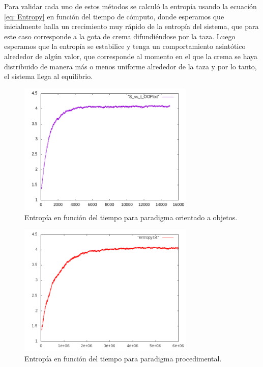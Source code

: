 \documentclass[12pt,twocolumn]{article}
\begin{document}
Para validar cada uno de estos métodos se calculó la entropía usando la ecuación \ref{eq: Entropy} en función del tiempo de cómputo, donde esperamos que inicialmente halla un crecimiento muy rápido de la entropía del sistema, que para este caso corresponde a la gota de crema difundiéndose por la taza. Luego esperamos que la entropía se estabilice y tenga un comportamiento asintótico alrededor de algún valor, que corresponde al momento en el que la crema se haya distribuido de manera más o menos uniforme alrededor de la taza y por lo tanto, el sistema llega al equilibrio.
\\
\begin{figure}
    \centering
    \includegraphics[width=0.75\textwidth]{figs/S_vs_t_OOP.png}
    \caption{Entropía en función del tiempo para paradigma orientado a objetos.}
    \label{fig:s_vs_t_OOP}
\end{figure}
\begin{figure}
    \centering
    \includegraphics[width=0.75\textwidth]{figs/entropy.png}
    \caption{Entropía en función del tiempo para paradigma procedimental.}
    \label{fig:s_vs_t_Proc}
\end{figure}
\end{document}
